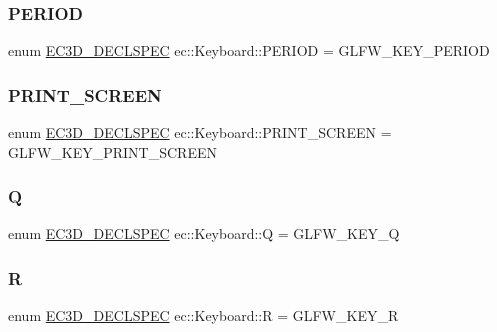 \subsubsection{\texorpdfstring{P\+E\+R\+I\+OD}{PERIOD}}
{\footnotesize\ttfamily enum \mbox{\hyperlink{_common_8h_aac42573e202ca3dd4d259c81691e2369}{E\+C3\+D\+\_\+\+D\+E\+C\+L\+S\+P\+EC}} ec\+::\+Keyboard\+::\+P\+E\+R\+I\+OD = G\+L\+F\+W\+\_\+\+K\+E\+Y\+\_\+\+P\+E\+R\+I\+OD}

\mbox{\label{classec_1_1_keyboard_a595cef3630be024a5b6ed5935372797b}} 
\subsubsection{\texorpdfstring{P\+R\+I\+N\+T\+\_\+\+S\+C\+R\+E\+EN}{PRINT\_SCREEN}}
{\footnotesize\ttfamily enum \mbox{\hyperlink{_common_8h_aac42573e202ca3dd4d259c81691e2369}{E\+C3\+D\+\_\+\+D\+E\+C\+L\+S\+P\+EC}} ec\+::\+Keyboard\+::\+P\+R\+I\+N\+T\+\_\+\+S\+C\+R\+E\+EN = G\+L\+F\+W\+\_\+\+K\+E\+Y\+\_\+\+P\+R\+I\+N\+T\+\_\+\+S\+C\+R\+E\+EN}

\mbox{\label{classec_1_1_keyboard_a7d2ade0eca9959dcd82b4c4ae9c3a27b}} 
\subsubsection{\texorpdfstring{Q}{Q}}
{\footnotesize\ttfamily enum \mbox{\hyperlink{_common_8h_aac42573e202ca3dd4d259c81691e2369}{E\+C3\+D\+\_\+\+D\+E\+C\+L\+S\+P\+EC}} ec\+::\+Keyboard\+::Q = G\+L\+F\+W\+\_\+\+K\+E\+Y\+\_\+Q}

\mbox{\label{classec_1_1_keyboard_a3f2649d7249962a4f485557e405d4754}} 
\subsubsection{\texorpdfstring{R}{R}}
{\footnotesize\ttfamily enum \mbox{\hyperlink{_common_8h_aac42573e202ca3dd4d259c81691e2369}{E\+C3\+D\+\_\+\+D\+E\+C\+L\+S\+P\+EC}} ec\+::\+Keyboard\+::R = G\+L\+F\+W\+\_\+\+K\+E\+Y\+\_\+R}

